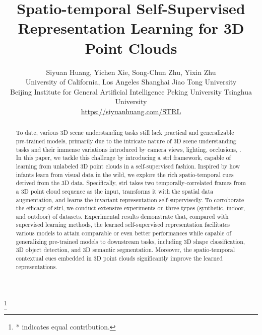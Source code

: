 \documentclass[10pt,twocolumn,letterpaper]{article}
\newcommand\blfootnote[1]{\begingroup
  \renewcommand\thefootnote{}\footnote{#1}\addtocounter{footnote}{-1}\endgroup
}
\begin{document}
\title{\vspace{-12pt}Spatio-temporal Self-Supervised Representation Learning for 3D Point Clouds}

\author{\vspace{3pt}Siyuan Huang, Yichen Xie, Song-Chun Zhu, Yixin Zhu\\
 University of California, Los Angeles  Shanghai Jiao Tong University \\\vspace{3pt}  Beijing Institute for General Artificial Intelligence
 Peking University  Tsinghua University\\
\url{https://siyuanhuang.com/STRL}\vspace{-15pt}\\
}

\maketitle

\blfootnote{* indicates equal contribution.}


\begin{abstract}
To date, various 3D scene understanding tasks still lack practical and generalizable pre-trained models, primarily due to the intricate nature of 3D scene understanding tasks and their immense variations introduced by camera views, lighting, occlusions, \etc. In this paper, we tackle this challenge by introducing a \acf{strl} framework, capable of learning from unlabeled 3D point clouds in a self-supervised fashion. Inspired by how infants learn from visual data in the wild, we explore the rich spatio-temporal cues derived from the 3D data. Specifically, \ac{strl} takes two temporally-correlated frames from a 3D point cloud sequence as the input, transforms it with the spatial data augmentation, and learns the invariant representation self-supervisedly. To corroborate the efficacy of \ac{strl}, we conduct extensive experiments on three types (synthetic, indoor, and outdoor) of datasets. Experimental results demonstrate that, compared with supervised learning methods, the learned self-supervised representation facilitates various models to attain comparable or even better performances while capable of generalizing pre-trained models to downstream tasks, including 3D shape classification, 3D object detection, and 3D semantic segmentation. Moreover, the spatio-temporal contextual cues embedded in 3D point clouds significantly improve the learned representations.
\end{abstract}
\end{document}
